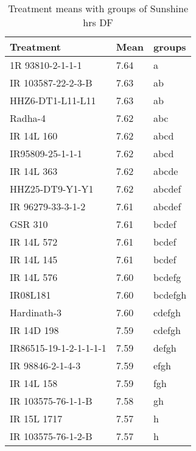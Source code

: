 \documentclass[]{article}
\begin{document}
\begin{longtable}{lll}
\caption{\label{tab:two-fac-groups-tab-agroclimate-early}Treatment means with groups of Sunshine hrs DF}\\
\toprule
Treatment & Mean & groups\\
\midrule
\rowcolor{gray!6}  1R 93810-2-1-1-1 & 7.64 & a\\
IR 103587-22-2-3-B & 7.63 & ab\\
\rowcolor{gray!6}  HHZ6-DT1-L11-L11 & 7.63 & ab\\
Radha-4 & 7.62 & abc\\
\rowcolor{gray!6}  IR 14L 160 & 7.62 & abcd\\
\addlinespace
IR95809-25-1-1-1 & 7.62 & abcd\\
\rowcolor{gray!6}  IR 14L 363 & 7.62 & abcde\\
HHZ25-DT9-Y1-Y1 & 7.62 & abcdef\\
\rowcolor{gray!6}  IR 96279-33-3-1-2 & 7.61 & abcdef\\
GSR 310 & 7.61 & bcdef\\
\addlinespace
\rowcolor{gray!6}  IR 14L 572 & 7.61 & bcdef\\
IR 14L 145 & 7.61 & bcdef\\
\rowcolor{gray!6}  IR 14L 576 & 7.60 & bcdefg\\
IR08L181 & 7.60 & bcdefgh\\
\rowcolor{gray!6}  Hardinath-3 & 7.60 & cdefgh\\
\addlinespace
IR 14D 198 & 7.59 & cdefgh\\
\rowcolor{gray!6}  IR86515-19-1-2-1-1-1-1 & 7.59 & defgh\\
IR 98846-2-1-4-3 & 7.59 & efgh\\
\rowcolor{gray!6}  IR 14L 158 & 7.59 & fgh\\
IR 103575-76-1-1-B & 7.58 & gh\\
\addlinespace
\rowcolor{gray!6}  IR 15L 1717 & 7.57 & h\\
IR 103575-76-1-2-B & 7.57 & h\\
\bottomrule
\end{longtable}
\endgroup{}
\begingroup\fontsize{12}{14}\selectfont
\end{document}
